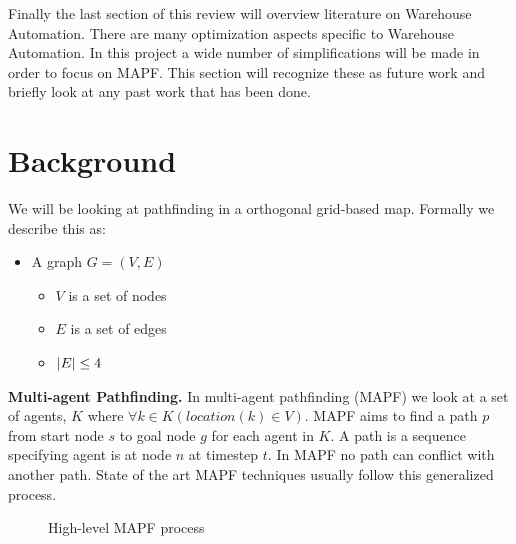 \documentclass[a4paper,11pt]{article}
\begin{document}
Finally the last section of this review will overview literature on Warehouse Automation. There are many optimization aspects specific to Warehouse Automation. In this project a wide number of simplifications will be made in order to focus on MAPF. This section will recognize these as future work and briefly look at any past work that has been done.

\section{Background}

We will be looking at pathfinding in a orthogonal grid-based map. Formally we describe this as:


\begin{itemize}
	\item A graph $G = (V, E)$
	\begin{itemize}
		\item $V$ is a set of nodes
		\item $E$ is a set of edges
		\item $\abs{E} \le 4$
	\end{itemize}
\end{itemize}

\noindent \textbf{Multi-agent Pathfinding.} In multi-agent pathfinding (MAPF) we look at a set of agents, $K$ where $\forall k \in K (location(k) \in V)$. MAPF aims to find a path $p$ from start node $s$ to goal node $g$ for each agent in $K$. A path is a sequence specifying agent is at node $n$ at timestep $t$. In MAPF no path can conflict with another path. State of the art MAPF techniques usually follow this generalized process.
	

\begin{figure}[H]
\centering
{}
\caption{High-level MAPF process}
\end{figure}
\end{document}
